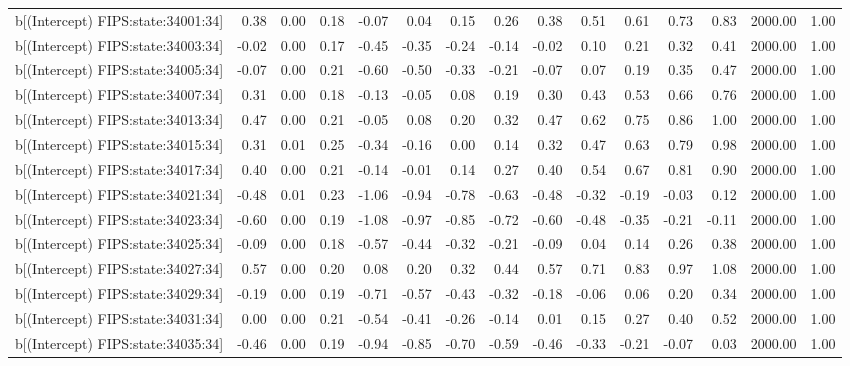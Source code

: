 \begin{table}[ht]
\begin{tabular}{rrrrrrrrrrrrrrr}
  b[(Intercept) FIPS:state:34001:34] & 0.38 & 0.00 & 0.18 & -0.07 & 0.04 & 0.15 & 0.26 & 0.38 & 0.51 & 0.61 & 0.73 & 0.83 & 2000.00 & 1.00 \\ 
  b[(Intercept) FIPS:state:34003:34] & -0.02 & 0.00 & 0.17 & -0.45 & -0.35 & -0.24 & -0.14 & -0.02 & 0.10 & 0.21 & 0.32 & 0.41 & 2000.00 & 1.00 \\ 
  b[(Intercept) FIPS:state:34005:34] & -0.07 & 0.00 & 0.21 & -0.60 & -0.50 & -0.33 & -0.21 & -0.07 & 0.07 & 0.19 & 0.35 & 0.47 & 2000.00 & 1.00 \\ 
  b[(Intercept) FIPS:state:34007:34] & 0.31 & 0.00 & 0.18 & -0.13 & -0.05 & 0.08 & 0.19 & 0.30 & 0.43 & 0.53 & 0.66 & 0.76 & 2000.00 & 1.00 \\ 
  b[(Intercept) FIPS:state:34013:34] & 0.47 & 0.00 & 0.21 & -0.05 & 0.08 & 0.20 & 0.32 & 0.47 & 0.62 & 0.75 & 0.86 & 1.00 & 2000.00 & 1.00 \\ 
  b[(Intercept) FIPS:state:34015:34] & 0.31 & 0.01 & 0.25 & -0.34 & -0.16 & 0.00 & 0.14 & 0.32 & 0.47 & 0.63 & 0.79 & 0.98 & 2000.00 & 1.00 \\ 
  b[(Intercept) FIPS:state:34017:34] & 0.40 & 0.00 & 0.21 & -0.14 & -0.01 & 0.14 & 0.27 & 0.40 & 0.54 & 0.67 & 0.81 & 0.90 & 2000.00 & 1.00 \\ 
  b[(Intercept) FIPS:state:34021:34] & -0.48 & 0.01 & 0.23 & -1.06 & -0.94 & -0.78 & -0.63 & -0.48 & -0.32 & -0.19 & -0.03 & 0.12 & 2000.00 & 1.00 \\ 
  b[(Intercept) FIPS:state:34023:34] & -0.60 & 0.00 & 0.19 & -1.08 & -0.97 & -0.85 & -0.72 & -0.60 & -0.48 & -0.35 & -0.21 & -0.11 & 2000.00 & 1.00 \\ 
  b[(Intercept) FIPS:state:34025:34] & -0.09 & 0.00 & 0.18 & -0.57 & -0.44 & -0.32 & -0.21 & -0.09 & 0.04 & 0.14 & 0.26 & 0.38 & 2000.00 & 1.00 \\ 
  b[(Intercept) FIPS:state:34027:34] & 0.57 & 0.00 & 0.20 & 0.08 & 0.20 & 0.32 & 0.44 & 0.57 & 0.71 & 0.83 & 0.97 & 1.08 & 2000.00 & 1.00 \\ 
  b[(Intercept) FIPS:state:34029:34] & -0.19 & 0.00 & 0.19 & -0.71 & -0.57 & -0.43 & -0.32 & -0.18 & -0.06 & 0.06 & 0.20 & 0.34 & 2000.00 & 1.00 \\ 
  b[(Intercept) FIPS:state:34031:34] & 0.00 & 0.00 & 0.21 & -0.54 & -0.41 & -0.26 & -0.14 & 0.01 & 0.15 & 0.27 & 0.40 & 0.52 & 2000.00 & 1.00 \\ 
  b[(Intercept) FIPS:state:34035:34] & -0.46 & 0.00 & 0.19 & -0.94 & -0.85 & -0.70 & -0.59 & -0.46 & -0.33 & -0.21 & -0.07 & 0.03 & 2000.00 & 1.00 \\ 

\end{tabular}
\end{table}
